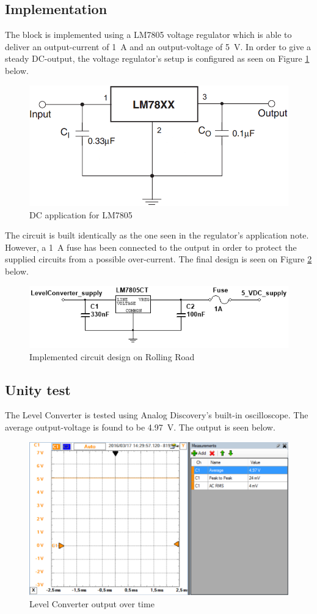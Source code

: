 \subsection{Implementation}
The block is implemented using a LM7805 voltage regulator which is able to deliver an output-current of \SI{1}{\ampere} and an output-voltage of \SI{5}{\volt}. In order to give a steady DC-output, the voltage regulator's setup is configured as seen on Figure \ref{fig:LM7805_app} below.

\begin{figure}[H]
	\centering
	\includegraphics[width=0.4\linewidth]{Hardware/Pictures/LM7805}
	\caption{DC application for LM7805}
	\label{fig:LM7805_app}
\end{figure}

The circuit is built identically as the one seen in the regulator's application note. However, a \SI{1}{\ampere} fuse has been connected to the output in order to protect the supplied circuits from a possible over-current. The final design is seen on Figure \ref{fig:DesignLevelConverter} below.

\begin{figure}[H]
	\centering
	\includegraphics[width=0.7\linewidth]{Hardware/Pictures/DesignLevelConverter}
	\caption{Implemented circuit design on Rolling Road}
	\label{fig:DesignLevelConverter}
\end{figure}

\subsection{Unity test}
The Level Converter is tested using Analog Discovery's built-in oscilloscope. The average output-voltage is found to be \SI{4.97}{\volt}. The output is seen below.

\begin{figure}[H]
	\centering
	\includegraphics[width=0.9\linewidth]{Hardware/Pictures/LevelConverter_test}
	\caption{Level Converter output over time}
	\label{fig:LevelConverter_test}
\end{figure}